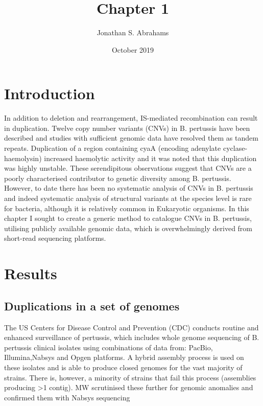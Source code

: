 \documentclass{article}
\title{Chapter 1}
\author{Jonathan S. Abrahams }
\date{October 2019}
\begin{document}
\maketitle

\section{Introduction}
In addition to deletion and rearrangement, IS-mediated recombination can result in duplication. Twelve copy number variants (CNVs) in B. pertussis have been described and studies with sufficient genomic data have resolved them as tandem repeats. Duplication of a region containing cyaA (encoding adenylate cyclase-haemolysin) increased haemolytic activity and it was noted that this duplication was highly unstable. These serendipitous observations suggest that CNVs are a poorly characterised contributor to genetic diversity among B. pertussis. However, to date there has been no systematic analysis of CNVs in B. pertussis and indeed systematic analysis of structural variants at the species level is rare for bacteria, although it is relatively common in Eukaryotic organisms. In this chapter I sought to create a generic method to catalogue CNVs in B. pertussis, utilising publicly available genomic data, which is overwhelmingly derived from short-read sequencing platforms. 

\section{Results}

\subsection{Duplications in a set of genomes}

The US Centers for Disease Control and Prevention (CDC) conducts routine and enhanced surveillance of pertussis, which includes whole genome sequencing of B. pertussis clinical isolates using combinations of data from: PacBio, Illumina,Nabsys and Opgen platforms.  A hybrid assembly process is used on these isolates and is able to produce closed genomes for the vast majority of strains\cite{WhoopingGenomeEpidemicsc}. There is, however, a minority of strains that fail this process (assemblies producing >1 contig). MW scrutinised these further for genomic anomalies and confirmed them with Nabsys sequencing\cite{Weigand2018ScreeningPertussis/ie}
\end{document}
